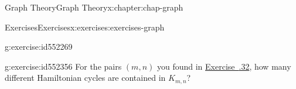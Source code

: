\documentclass[oneside,10pt,]{book}
\newcommand{\xreffont}{\relax}
\numberwithin{equation}{section}
\providecommand\phantomsection{}
\begin{document}
\begin{chapterptx}{Graph Theory}{}{Graph Theory}{}{}{x:chapter:chap-graph}
\begin{exercises-section}{Exercises}{}{Exercises}{}{}{x:exercises:exercises-graph}
\begin{divisionexercise}{35}{}{}{g:exercise:id552269}
\begin{sidebyside}{3}{0.22}{0.22}{0.025}
\begin{sbspanel}{0.17}
{
}%
\end{sbspanel}%
\end{sidebyside}%
\end{divisionexercise}%
\begin{divisionexercise}{36}{}{}{g:exercise:id552356}%
For the pairs \((m,n)\) you found in \hyperlink{x:exercise:ex-hamiltonian-kmn}{Exercise~{\xreffont 5.8.32}}, how many different Hamiltonian cycles are contained in \(K_{m,n}\)?%
\end{divisionexercise}%
\end{exercises-section}
\end{chapterptx}
%
\appendix%
%
\clearpage\phantomsection%
%
%
%
\typeout{************************************************}
\typeout{************************************************}
%
\end{document}
